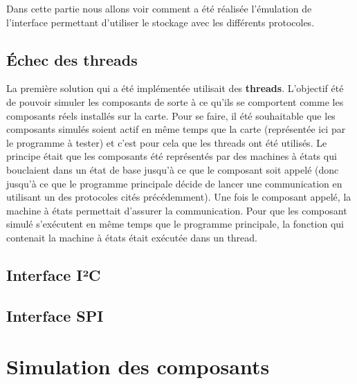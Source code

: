 \documentclass[a4paper]{article}
\begin{document}
Dans cette partie nous allons voir comment a été réalisée l'émulation de
l'interface permettant d'utiliser le stockage avec les différents protocoles.

\subsection{Échec des threads}

La première solution qui a été implémentée utilisait des \textbf{threads}.
L'objectif été de pouvoir simuler les composants de sorte à ce qu'ils se
comportent comme les composants réels installés sur la carte. Pour se faire, il
été souhaitable que les composants simulés soient actif en même temps que la
carte (représentée ici par le programme à tester) et c'est pour cela que les
threads ont été utilisés. Le principe était que les composants été représentés
par des machines à états qui bouclaient dans un état de base jusqu'à ce que le
composant soit appelé (donc jusqu'à ce que le programme principale décide de
lancer une communication en utilisant un des protocoles cités précédemment). Une
fois le composant appelé, la machine à états permettait d'assurer la
communication. Pour que les composant simulé s'exécutent en même temps que le
programme principale, la fonction qui contenait la machine à états était
exécutée dans un thread.

\subsection{Interface I²C}


\subsection{Interface SPI}



\section{Simulation des composants}
\end{document}
